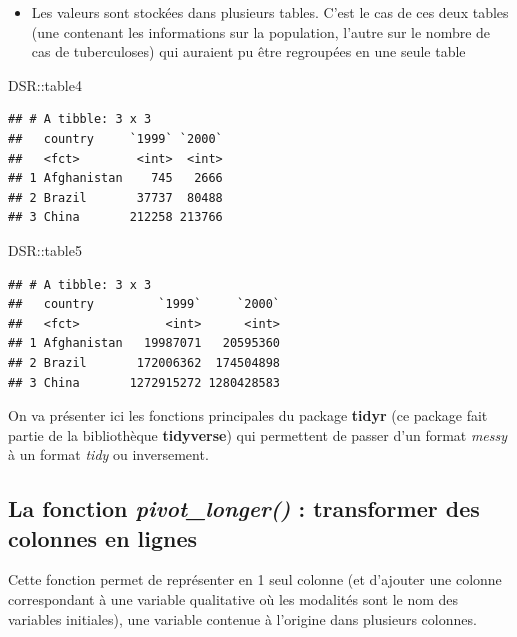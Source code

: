 \documentclass[
]{book}
\newenvironment{Shaded}{\begin{snugshade}}{\end{snugshade}}
\newcommand{\NormalTok}[1]{#1}
\newcommand{\SpecialCharTok}[1]{\textcolor[rgb]{0.00,0.00,0.00}{#1}}
\providecommand{\tightlist}{%
  \setlength{\itemsep}{0pt}\setlength{\parskip}{0pt}}
\theoremstyle{definition}
\theoremstyle{definition}
\theoremstyle{definition}
\theoremstyle{definition}
\theoremstyle{remark}
\begin{document}
\begin{itemize}
\tightlist
\item
  Les valeurs sont stockées dans plusieurs tables. C'est le cas de ces deux tables (une contenant les informations sur la population, l'autre sur le nombre de cas de tuberculoses) qui auraient pu être regroupées en une seule table
\end{itemize}

\begin{Shaded}
\begin{Highlighting}[]
\NormalTok{DSR}\SpecialCharTok{::}\NormalTok{table4}
\end{Highlighting}
\end{Shaded}

\begin{verbatim}
## # A tibble: 3 x 3
##   country     `1999` `2000`
##   <fct>        <int>  <int>
## 1 Afghanistan    745   2666
## 2 Brazil       37737  80488
## 3 China       212258 213766
\end{verbatim}

\begin{Shaded}
\begin{Highlighting}[]
\NormalTok{DSR}\SpecialCharTok{::}\NormalTok{table5}
\end{Highlighting}
\end{Shaded}

\begin{verbatim}
## # A tibble: 3 x 3
##   country         `1999`     `2000`
##   <fct>            <int>      <int>
## 1 Afghanistan   19987071   20595360
## 2 Brazil       172006362  174504898
## 3 China       1272915272 1280428583
\end{verbatim}

On va présenter ici les fonctions principales du package \textbf{tidyr} (ce package fait partie de la bibliothèque \textbf{tidyverse}) qui permettent de passer d'un format \emph{messy} à un format \emph{tidy} ou inversement.

\hypertarget{la-fonction-pivot_longer-transformer-des-colonnes-en-lignes}{%
\subsection{\texorpdfstring{La fonction \emph{pivot\_longer()} : transformer des colonnes en lignes}{La fonction pivot\_longer() : transformer des colonnes en lignes}}\label{la-fonction-pivot_longer-transformer-des-colonnes-en-lignes}}

Cette fonction permet de représenter en 1 seul colonne (et d'ajouter une colonne correspondant à une variable qualitative où les modalités sont le nom des variables initiales), une variable contenue à l'origine dans plusieurs colonnes.
\end{document}

